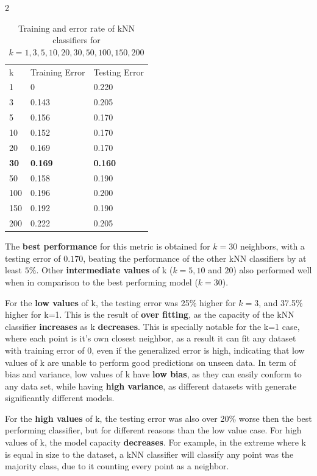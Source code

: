 \begin{paracol}{2}
  
  \begin{table}[t!]
    \begin{tabular}{lll}
      k   & Training Error & Testing Error \\
      1   & 0              & 0.220         \\
      3   & 0.143          & 0.205         \\
      5   & 0.156          & 0.170         \\
      10  & 0.152          & 0.170         \\
      20  & 0.169          & 0.170         \\
      \textbf{ 30}  & \textbf{0.169}          & \textbf{0.160}         \\
      50  & 0.158          & 0.190         \\
      100 & 0.196          & 0.200         \\
      150 & 0.192          & 0.190         \\
      200 & 0.222          & 0.205        
    \end{tabular}
    \caption{Training and error rate of kNN classifiers for $k = 1,3,5,10,20,30,50,100,150,200$}
    \label{tab:Q1errors}
  \end{table}


  The \textbf{best performance} for this metric is obtained for $k=30$ neighbors, with a testing
  error of $0.170$, beating the performance of the other kNN classifiers by at least $5\%$.
  Other \textbf{intermediate values} of k ($k=5, 10$ and $20$) also
  performed well when in comparison to the best performing model ($k=30$).

  For the \textbf{low values} of k, the testing error was  25\% higher for $k=3$,
  and 37.5\% higher for k=1. This is the result of
  \textbf{over fitting}, as the capacity of the kNN classifier \textbf{increases} as k \textbf{decreases}.
  This is specially notable for the k=1 case, where each point is it's own closest neighbor, as a result
  it can fit any dataset with training error of 0, even if the generalized error is high, indicating that low
  values of k are unable to perform good predictions on unseen data. In term of bias and variance,
  low values of k have \textbf{low bias}, as they can easily conform to any data set, while having
  \textbf{high variance}, as different datasets with generate significantly different models.

  For the \textbf{high values} of k, the testing error was also over 20\% worse then the best
  performing classifier, but for different reasons than the low value case. For high values of
  k, the model capacity \textbf{decreases}. For example, in the extreme where k is equal in size to the
  dataset, a kNN classifier will classify any point was the majority class, due to it counting
  every point as a neighbor.


\end{paracol}
